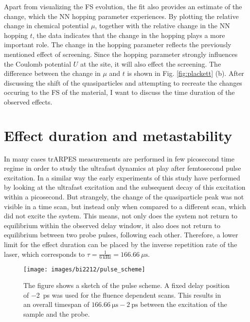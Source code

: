 Apart from visualizing the FS evolution, the fit also provides an estimate of the change, which the NN hopping parameter experiences.
By plotting the relative change in chemical potential $\mu$, together with the relative change in the NN hopping $t$, the data indicates that the change in the hopping plays a more important role.
The change in the hopping parameter reflects the previously mentioned effect of screening.
Since the hopping parameter strongly influences the Coulomb potential $U$ at the  site, it will also effect the screening.
The difference between the change in $\mu$ and $t$ is shown in Fig. \ref{fig:plackett} (b).
After discussing the shift of the quasiparticles and attempting to recreate the changes occuring to the FS of the material, I want to discuss the time duration of the observed effects.

\section{Effect duration and metastability}
\label{sec:meta}

In many cases trARPES measurements are performed in few picosecond time regime in order to study the ultrafast dynamics at play after femtosecond pulse excitation.
In a similar way the early experiments of this study have performed by looking at the ultrafast excitation and the subsequent decay of this excitation within a picosecond.
But strangely, the change of the quasiparticle peak was not visible in a time scan, but instead only when compared to a different scan, which did not excite the system.
This means, not only does the system not return to equilibrium within the observed delay window, it also does not return to equilibrium between two probe pulses, following each other.
Therefore, a lower limit for the effect duration can be placed by the inverse repetition rate of the laser, which corresponds to $\tau=\frac{1}{\qty{6}{\kilo\hertz}}=\qty{166.66}{\mu\second}$.

\begin{figure}
	\centering
	\texttt{[image: images/bi2212/pulse\_scheme]}
	\caption{The figure shows a sketch of the pulse scheme. A fixed delay position of \qty{-2}{\pico\second} was used for the fluence dependent scans. This results in an overall timespan of $\qty{166.66}{\micro\second}-\qty{2}{\pico\second}$ between the excitation of the sample and the probe.}
	\label{fig:pulsescheme}
\end{figure}

